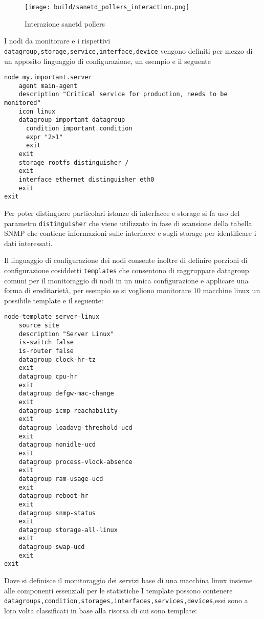 \begin{figure}[H]
    \centering
    \texttt{[image: build/sanetd\_pollers\_interaction.png]}
    \caption{Interazione sanetd pollers}
    \label{fig:enter-label}
\end{figure}

I nodi da monitorare e i rispettivi \verb|datagroup,storage,service,interface,device| vengono definiti per mezzo di un apposito linguaggio di configurazione, un esempio e il seguente

\begin{lstlisting}
node my.important.server
    agent main-agent
    description "Critical service for production, needs to be monitored"
    icon linux
    datagroup important datagroup
      condition important condition
      expr "2>1"
      exit
    exit
    storage rootfs distinguisher /
    exit
    interface ethernet distinguisher eth0
    exit
exit
\end{lstlisting}

Per poter distinguere particolari istanze di interfacce e storage si fa uso del parametro \verb|distinguisher| che viene utilizzato in fase di scansione della tabella SNMP che contiene informazioni sulle interfacce e sugli storage per identificare i dati interessati.

Il linguaggio di configurazione dei nodi consente inoltre di definire porzioni di configurazione cosiddetti \verb|templates| che consentono di raggruppare datagroup comuni per il monitoraggio di nodi in un unica configurazione e applicare una forma di ereditarietà, per esempio se si vogliono monitorare 10 macchine linux un possibile template e il seguente:

\begin{lstlisting}
node-template server-linux
    source site
    description "Server Linux"
    is-switch false
    is-router false
    datagroup clock-hr-tz
    exit
    datagroup cpu-hr
    exit
    datagroup defgw-mac-change
    exit
    datagroup icmp-reachability
    exit
    datagroup loadavg-threshold-ucd
    exit
    datagroup nonidle-ucd
    exit
    datagroup process-vlock-absence
    exit
    datagroup ram-usage-ucd
    exit
    datagroup reboot-hr
    exit
    datagroup snmp-status
    exit
    datagroup storage-all-linux
    exit
    datagroup swap-ucd
    exit
exit
\end{lstlisting}

Dove si definisce il monitoraggio dei servizi base di una macchina linux insieme alle componenti essenziali per le statistiche
I template possono contenere \verb|datagroups,condition,storages,interfaces,services,devices|,essi sono a loro volta classificati in base alla risorsa di cui sono template:


